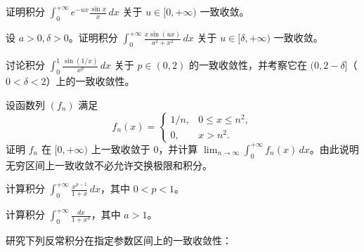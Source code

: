 \newpage
\noindent\begin{minipage}{\textwidth}
证明积分 $\displaystyle\int_0^{+\infty}e^{-ux}\frac{\sin x}{x}\,dx$ 关于 $u\in[0,+\infty)$ 一致收敛。
\end{minipage}\par\vfill
\noindent\begin{minipage}{\textwidth}
设 $a>0,\delta>0$。证明积分 $\displaystyle\int_0^{+\infty}\frac{x\sin(ux)}{a^2+x^2}\,dx$ 关于 $u\in[\delta,+\infty)$ 一致收敛。
\end{minipage}\par\vfill
\noindent\begin{minipage}{\textwidth}
讨论积分 $\displaystyle\int_0^1\frac{\sin(1/x)}{x^p}\,dx$ 关于 $p\in(0,2)$ 的一致收敛性，并考察它在 $(0,2-\delta]$（$0<\delta<2$）上的一致收敛性。
\end{minipage}\par\vfill
\newpage
\noindent\begin{minipage}{\textwidth}
设函数列 $(f_n)$ 满足\[f_n(x)=\begin{cases}1/n,&0\le x\le n^2,\\0,&x>n^2.\end{cases}\] 证明 $f_n$ 在 $[0,+\infty)$ 上一致收敛于 $0$，并计算 $\lim_{n\to\infty}\int_0^{+\infty}f_n(x)\,dx$。由此说明无穷区间上一致收敛不必允许交换极限和积分。
\end{minipage}\par\vfill
\noindent\begin{minipage}{\textwidth}
计算积分 $\displaystyle\int_0^{+\infty}\frac{x^{p-1}}{1+x}\,dx$，其中 $0<p<1$。
\end{minipage}\par\vfill
\noindent\begin{minipage}{\textwidth}
计算积分 $\displaystyle\int_0^{+\infty}\frac{dx}{1+x^a}$，其中 $a>1$。
\end{minipage}\par\vfill
\newpage
\noindent\begin{minipage}{\textwidth}
研究下列反常积分在指定参数区间上的一致收敛性：
\end{minipage}\par\vfill
